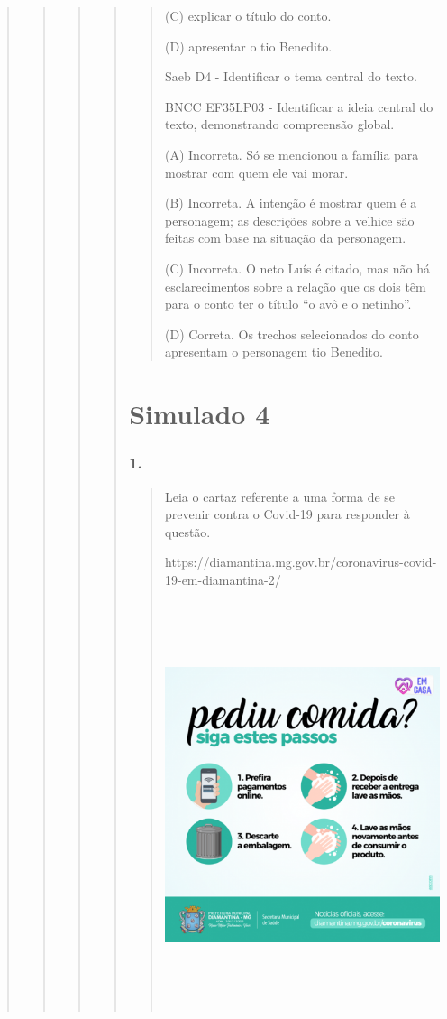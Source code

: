 \begin{quote}
\begin{quote}
\begin{quote}
\begin{quote}
\begin{quote}
(C) explicar o título do conto.

(D) apresentar o tio Benedito.

Saeb D4 - Identificar o tema central do texto.

BNCC EF35LP03 - Identificar a ideia central do texto, demonstrando
compreensão global.

(A) Incorreta. Só se mencionou a família para mostrar com quem ele vai
morar.

(B) Incorreta. A intenção é mostrar quem é a personagem; as descrições
sobre a velhice são feitas com base na situação da personagem.

(C) Incorreta. O neto Luís é citado, mas não há esclarecimentos sobre a
relação que os dois têm para o conto ter o título ``o avô e o netinho''.

(D) Correta. Os trechos selecionados do conto apresentam o personagem
tio Benedito.
\end{quote}

\section{Simulado 4}\label{simulado-4}

\subsubsection{1. }\label{section-91}

\begin{quote}
Leia o cartaz referente a uma forma de se prevenir contra o Covid-19
para responder à questão.

https://diamantina.mg.gov.br/coronavirus-covid-19-em-diamantina-2/

\includegraphics[width=4.68750in,height=4.68750in]{media/image36.png}


\end{quote}
\end{quote}
\end{quote}
\end{quote}
\end{quote}
